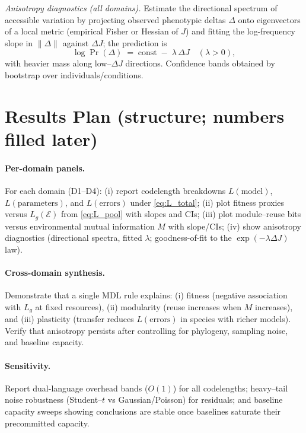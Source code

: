 \documentclass[11pt,a4paper]{article}
\begin{document}
\medskip
\noindent\emph{Anisotropy diagnostics (all domains).} Estimate the directional spectrum of accessible variation by projecting observed phenotypic deltas $\Delta$ onto eigenvectors of a local metric (empirical Fisher or Hessian of $J$) and fitting the log-frequency slope in $\|\Delta\|$ against \(\Delta J\); the prediction is
\[
\log \Pr(\Delta) \;=\; \mathrm{const} \;-\; \lambda\,\Delta J \quad (\lambda>0),
\]
with heavier mass along low–$\Delta J$ directions. Confidence bands obtained by bootstrap over individuals/conditions.


\section{Results Plan (structure; numbers filled later)}

\paragraph{Per-domain panels.}
For each domain (D1–D4): (i) report codelength breakdowns $L(\text{model})$, $L(\text{parameters})$, and $L(\text{errors})$ under \eqref{eq:L_total}; (ii) plot fitness proxies versus $L_g(\mathcal{E})$ from \eqref{eq:L_pool} with slopes and CIs; (iii) plot module–reuse bits versus environmental mutual information $M$ with slope/CIs; (iv) show anisotropy diagnostics (directional spectra, fitted $\lambda$; goodness-of-fit to the $\exp(-\lambda \Delta J)$ law).

\paragraph{Cross-domain synthesis.}
Demonstrate that a single MDL rule explains: (i) fitness (negative association with $L_g$ at fixed resources), (ii) modularity (reuse increases when $M$ increases), and (iii) plasticity (transfer reduces $L(\text{errors})$ in species with richer models). Verify that anisotropy persists after controlling for phylogeny, sampling noise, and baseline capacity.

\paragraph{Sensitivity.}
Report dual-language overhead bands ($O(1)$) for all codelengths; heavy–tail noise robustness (Student–$t$ vs Gaussian/Poisson) for residuals; and baseline capacity sweeps showing conclusions are stable once baselines saturate their precommitted capacity.
\end{document}
